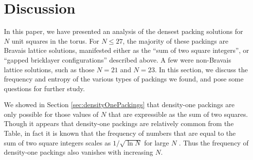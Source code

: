 \documentclass[preprint,aps]{revtex4}
\begin{document}
%
%
\section{Discussion}
\label{sec:discussion}

In this paper, we have presented an analysis of the densest packing solutions for $N$ unit squares in the torus.  For $N \leq 27$, the majority of these packings are Bravais lattice solutions, manifested either as the ``sum of two square integers'', or ``gapped bricklayer configurations'' described above. A few were non-Bravais lattice solutions, such as those $N=21$ and $N=23$. In this section, we discuss the frequency and entropy of the various types of packings we found, and pose some questions for further study.

We showed in Section \ref{sec:densityOnePackings} that density-one packings are only possible for those values of $N$ that are expressible as the sum of two squares. 
Though it appears that density-one packings are relatively common from the Table, in fact it is known that the frequency of numbers that are equal to the sum of two square integers scales as $1/\sqrt{\ln N}$ for large $N$ \cite{Berndt1993,Landau1909}.
Thus the frequency of density-one packings also vanishes with increasing $N$.
\end{document}
